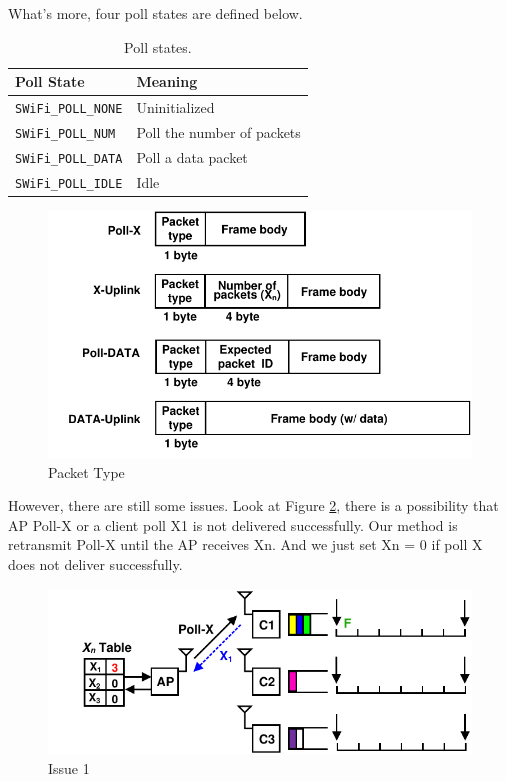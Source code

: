 \documentclass{article}
\begin{document}
  
What's more, four poll states are defined below. 
\begin{table}[h!]
   \centering
   \caption{Poll states.}
   \label{tab:table4}
   \begin{tabular}{| l | l |}
      \hline
      Poll State  &  Meaning\\ \hline
      \lstinline |SWiFi_POLL_NONE| & Uninitialized \\ \hline 
      \lstinline |SWiFi_POLL_NUM|  & Poll the number of packets\\ \hline 
      \lstinline |SWiFi_POLL_DATA| & Poll a data packet\\ \hline 
      \lstinline |SWiFi_POLL_IDLE| & Idle\\  
     \hline
   \end{tabular}
\end{table}
     
\begin{figure}[htbp]
\centering
\includegraphics[scale=0.6]{header.pdf}
\caption{Packet Type}
\label{header}
\end{figure}

However, there are still some issues. Look at Figure \ref{discussion_1}, there is a possibility that AP Poll-X or a client poll X1 is not delivered successfully. Our method is retransmit Poll-X until the AP receives Xn. And we just set Xn = 0 if poll X does not deliver successfully. 

\begin{figure}[htbp]
\centering
\includegraphics[scale=0.8]{discussion_1.pdf}
\caption{Issue 1}
\label{discussion_1}
\end{figure}
\end{document}
